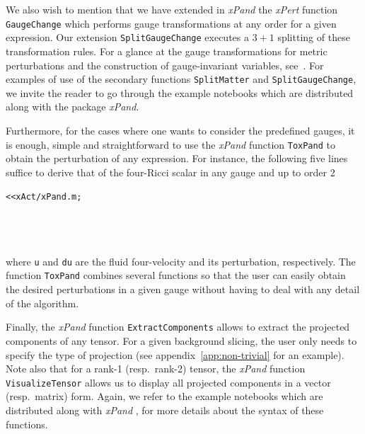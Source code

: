 \documentclass[notitlepage,onecolumn,floatfix,preprintnumbers,aps,prd,showpacs,nofootinbib,amsmath,amssymb,amsfonts]{revtex4-1}
\newcommand{\<}{\langle}
\renewcommand{\>}{\rangle}
\newcommand{\ttgr}[1]{{#1}}
\newcommand{\bb}{{\ttgr{\alpha}}}
\newcommand{\cc}{{\ttgr{\beta}}}
\newcommand{\ii}{{\ttgr{\mu}}}
\newcommand{\jj}{{\ttgr{\nu}}}
\begin{document}
We also wish to mention that we have extended in \textit{xPand} the \textit{xPert} function 
{\tt GaugeChange} which performs gauge transformations at any order for a given expression. 
Our extension {\tt SplitGaugeChange} executes a $3+1$ splitting of these transformation rules. 
For a glance at the gauge transformations for metric perturbations and the construction of
gauge-invariant variables, see~\cite{Bardeen:1980kt,Bruni:1996im,Malik:2001rm,Nakamura2007}. 
For examples of use of the secondary functions 
{\tt SplitMatter} and {\tt SplitGaugeChange}, we invite the reader to go through the example 
notebooks which are distributed along with the package \textit{xPand}. 

Furthermore, for the cases where one wants to consider the predefined gauges, it is enough, simple and straightforward 
to use the \textit{xPand} function {\tt ToxPand} to obtain the perturbation of any expression. 
For instance, the following five lines suffice to derive that of the four-Ricci scalar in any gauge and up to order 2 

\vspace{3mm}
%
 {\tt<<xAct/xPand.m;} \\
\indent{\tt  DefManifold[ M, 4, \{$\bb$, $\cc$, $\ii$, $\jj$\} ];} \\
 \\
 \\
%
\vspace{3mm}

\noindent
where {\tt u} and {\tt du} are the fluid four-velocity and its perturbation, respectively. 
The function {\tt ToxPand} combines several functions so that the user can easily obtain the desired perturbations
in a given gauge without having to deal with any detail of the algorithm. 

Finally, the \textit{xPand} function {\tt ExtractComponents} allows to extract the projected 
components of any tensor. For a given background slicing, the user only needs to specify 
the type of projection (see appendix~\ref{app:non-trivial} for an example). Note also 
that for a rank-1 (resp.\ rank-2) tensor, the \textit{xPand} function {\tt VisualizeTensor} 
allows us to display all projected components in a vector (resp.\ matrix) form. Again, we refer 
to the example notebooks which are distributed along with \textit{xPand} \cite{xPand}, for more details 
about the syntax of these functions. 
\end{document}
